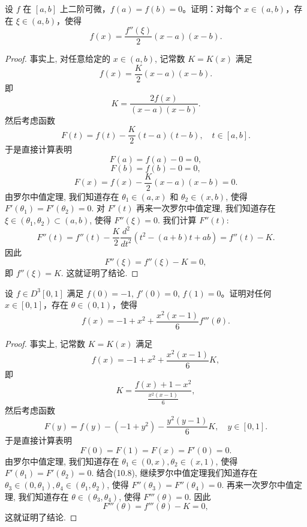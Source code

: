 \documentclass[lang=cn,10pt,thmcnt=section]{elegantbook}
\begin{document}
\begin{example}
	设 $f$ 在 $[a,b]$ 上二阶可微，$f(a) = f(b) = 0$。证明：对每个 $x \in (a,b)$，存在 $\xi \in (a,b)$，使得
    \[ f(x) = \frac{f''(\xi)}{2}(x-a)(x-b). \]
\end{example}
\begin{proof}
    事实上, 对任意给定的 $x \in (a,b)$, 记常数 $K = K(x)$ 满足
\[
f(x) = \frac{K}{2}(x-a)(x-b).
\]
即
\[
K = \frac{2f(x)}{(x-a)(x-b)}.
\]
然后考虑函数
\[
F(t) = f(t) - \frac{K}{2}(t-a)(t-b), \quad t \in [a, b].
\]
于是直接计算表明
\[
F(a) = f(a) - 0 = 0,
\]
\[
F(b) = f(b) - 0 = 0,
\]
\[
F(x) = f(x) - \frac{K}{2}(x-a)(x-b) = 0.
\]
由罗尔中值定理, 我们知道存在 $\theta_1 \in (a, x)$ 和 $\theta_2 \in (x, b)$, 使得 $F'(\theta_1) = F'(\theta_2) = 0$.
对 $F'(t)$ 再来一次罗尔中值定理, 我们知道存在 $\xi \in (\theta_1, \theta_2) \subset (a,b)$, 使得 $F''(\xi) = 0$.
我们计算 $F''(t)$:
\[
F''(t) = f''(t) - \frac{K}{2}\frac{d^2}{dt^2}(t^2 - (a+b)t + ab) = f''(t) - K.
\]
因此
\[
F''(\xi) = f''(\xi) - K = 0,
\]
即 $f''(\xi) = K$. 这就证明了结论.
\end{proof}
\begin{example}
	设 $f \in D^3[0,1]$ 满足 $f(0) = -1$, $f'(0) = 0$, $f(1) = 0$。证明对任何 $x \in [0,1]$，存在 $\theta \in (0,1)$，使得
    \[ f(x) = -1 + x^2 + \frac{x^2(x-1)}{6}f'''(\theta). \]
\end{example}
\begin{proof}
	事实上, 记常数 $K=K(x)$ 满足
\[
f(x) = -1 + x^2 + \frac{x^2(x-1)}{6}K,
\]
即
\[
K = \frac{f(x) + 1 - x^2}{\frac{x^2(x-1)}{6}},
\]
然后考虑函数
\[
F(y) = f(y) - (-1+y^2) - \frac{y^2(y-1)}{6}K, \quad y \in [0, 1].
\]
于是直接计算表明
\begin{equation}
F(0) = F(1) = F(x) = F'(0) = 0. 
\end{equation}
由罗尔中值定理, 我们知道存在 $\theta_1 \in (0, x), \theta_2 \in (x, 1)$, 使得 $F'(\theta_1) = F'(\theta_2) = 0$. 结合(10.8), 继续罗尔中值定理我们知道存在 $\theta_3 \in (0, \theta_1), \theta_4 \in (\theta_1, \theta_2)$, 使得 $F''(\theta_3) = F''(\theta_4) = 0$. 再来一次罗尔中值定理, 我们知道存在 $\theta \in (\theta_3, \theta_4)$, 使得 $F'''(\theta) = 0$. 因此
\[
F'''(\theta) = f'''(\theta) - K = 0,
\]
这就证明了结论.
\end{proof}
\end{document}
